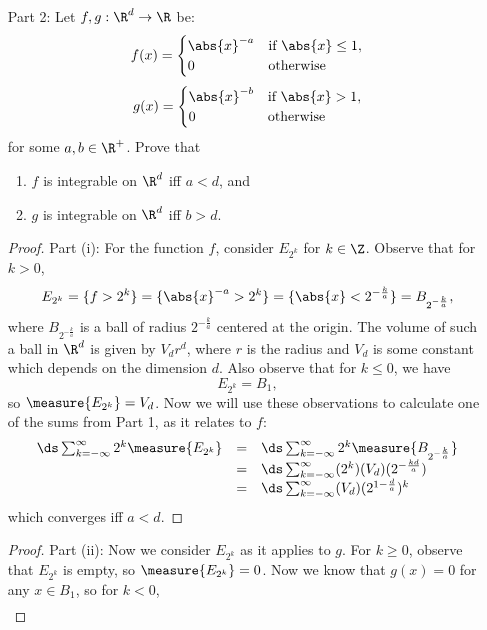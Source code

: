 \documentclass[letterpaper]{article}
\begin{document}
\begin{enumerate}
\begin{enumerate}
    \item[Part 2:] Let $f,g:\R^d\to\R$ be:
      $$f(x) = \begin{cases}
        \abs{x}^{-a} & \text{if } \abs{x}\leq1, \\
        0 & \text{otherwise}
      \end{cases}$$
      $$g(x) = \begin{cases}
        \abs{x}^{-b} & \text{if } \abs{x}>1, \\
        0 & \text{otherwise}
      \end{cases}$$
    for some $a,b\in\R^+$. Prove that
    \begin{enumerate}[label=(\roman*)]
      \item $f$ is integrable on $\R^d$ iff $a<d$, and
      \item $g$ is integrable on $\R^d$ iff $b>d$.
    \end{enumerate}
    \begin{proof}Part (i):
      For the function $f$, consider $E_{2^k}$ for $k\in\Z$.
      Observe that for $k>0$,
        $$E_{2^k} = \{f > 2^k\} = \{\abs{x}^{-a} > 2^k\} = \{\abs{x} < 2^{-\frac{k}{a}}\} = B_{2^{-\frac{k}{a}}},$$
      where $B_{2^{-\frac{k}{a}}}$ is a ball of radius $2^{-\frac{k}{a}}$ centered at the origin. The volume of such a ball in $\R^d$ is given by $V_dr^d$, where $r$ is the radius and $V_d$ is some constant which depends on the dimension $d$. Also observe that for $k\leq 0$, we have
        $$E_{2^k}=B_1,$$
      so $\measure{E_{2^k}}=V_d$. Now we will use these observations to calculate one of the sums from Part 1, as it relates to $f$:
      $$\begin{array}{rcl}
        \ds\sum_{k=-\infty}^\infty 2^k\measure{E_{2^k}} &=& \ds\sum_{k=-\infty}^\infty 2^k\measure{B_{2^{-\frac{k}{a}}}} \\
        &=& \ds\sum_{k=-\infty}^\infty (2^k)(V_d)(2^{-\frac{kd}{a}}) \\
        &=& \ds\sum_{k=-\infty}^\infty (V_d)(2^{1-\frac{d}{a}})^k \\
      \end{array}$$
      which converges iff $a<d$. \phantom\qedhere \qedwhite
    \end{proof}
    \begin{proof}Part (ii):
      Now we consider $E_{2^k}$ as it applies to $g$. For $k\geq0$, observe that $E_{2^k}$ is empty, so $\measure{E_{2^k}}=0$. Now we know that $g(x)=0$ for any $x\in B_1$, so for $k<0$,
      $$\begin{array}{rcl}

\end{array}$$
\end{proof}
\end{enumerate}
\end{enumerate}
\end{document}
